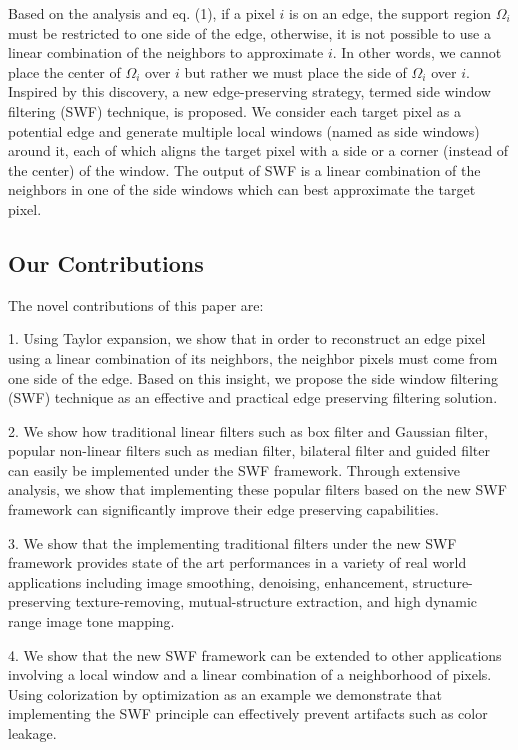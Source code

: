\documentclass[10pt,twocolumn,letterpaper]{article}
\begin{document}
Based on the analysis and eq. (1), if a pixel $i$ is on an edge, the support region $\Omega_i$ must be restricted to one side of the edge, otherwise, it is not possible to use a linear combination of the neighbors to approximate $i$. In other words, we cannot place the center of $\Omega_i$ over $i$ but rather we must place the side of $\Omega_i$ over $i$. Inspired by this discovery, a new edge-preserving strategy, termed side window filtering (SWF) technique, is proposed. We consider each target pixel as a potential edge and generate multiple local windows (named as side windows) around it, each of which aligns the target pixel with a side or a corner (instead of the center) of the window. The output of SWF is a linear combination of the neighbors in one of the side windows which can best approximate the target pixel. 

\subsection{Our Contributions}
The novel contributions of this paper are:

1. Using Taylor expansion, we show that in order to reconstruct an edge pixel using a linear combination of its neighbors, the neighbor pixels must come from one side of the edge. Based on this insight, we propose the side window filtering (SWF) technique as an effective and practical edge preserving filtering solution. 

2. We show how traditional linear filters such as box filter and Gaussian filter, popular non-linear filters such as median filter, bilateral filter and  guided filter can easily be implemented under the SWF framework. Through extensive analysis, we show that implementing these popular filters based on the new SWF framework can significantly improve their edge preserving capabilities.

3. We show that the implementing traditional filters under the new SWF framework provides state of the art performances in a variety of real world applications including image smoothing, denoising, enhancement,  structure-preserving texture-removing, mutual-structure extraction, and high dynamic range image tone mapping.

4. We show that the new SWF framework can be extended to other applications involving a local window and a linear combination of a neighborhood of pixels. Using colorization by optimization as an example we demonstrate that implementing the SWF principle can effectively prevent artifacts such as color leakage.
\end{document}

